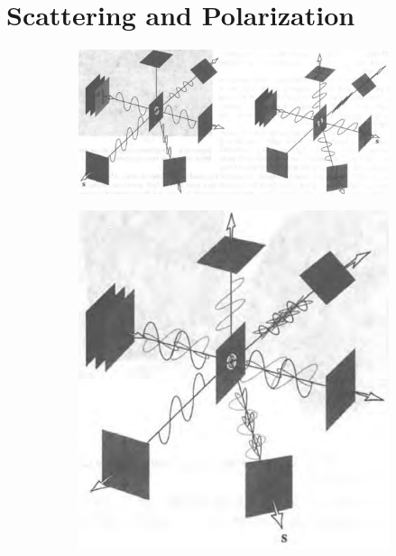 \section{Scattering and Polarization}

\begin{figure}[H]
  \centering
  \begin{subfigure}{.6\textwidth}
    \centering
    \includegraphics[width=\linewidth]{figures/Scattering-Polarization-1}
    \label{fig:}
  \end{subfigure}%
  \begin{subfigure}{.3\textwidth}
    \centering
    \includegraphics[width=0.9\linewidth]{figures/Scattering-Polarization-2}
    \label{fig:}
  \end{subfigure}
  \label{fig:}
\end{figure}

